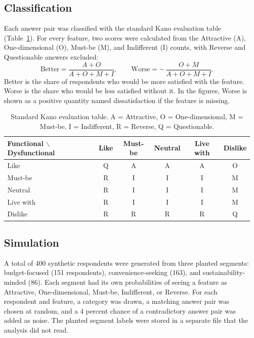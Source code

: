 \documentclass[11pt]{article}
\begin{document}
\subsection{Classification}
Each answer pair was classified with the standard Kano evaluation table (Table~\ref{tab:eval}). For every feature, two scores were calculated from the Attractive (A), One-dimensional (O), Must-be (M), and Indifferent (I) counts, with Reverse and Questionable answers excluded:
\[
\text{Better} = \frac{A + O}{A + O + M + I}, \qquad
\text{Worse} = -\,\frac{O + M}{A + O + M + I}.
\]
Better is the share of respondents who would be more satisfied with the feature. Worse is the share who would be less satisfied without it. In the figures, Worse is shown as a positive quantity named dissatisfaction if the feature is missing.

\begin{table}[H]
\centering
\caption{Standard Kano evaluation table. A = Attractive, O = One-dimensional, M = Must-be, I = Indifferent, R = Reverse, Q = Questionable.}
\label{tab:eval}
\begin{tabular}{lccccc}
\toprule
Functional $\backslash$ Dysfunctional & Like & Must-be & Neutral & Live with & Dislike \\
\midrule
Like      & Q & A & A & A & O \\
Must-be   & R & I & I & I & M \\
Neutral   & R & I & I & I & M \\
Live with & R & I & I & I & M \\
Dislike   & R & R & R & R & Q \\
\bottomrule
\end{tabular}
\end{table}

\subsection{Simulation}
A total of 400 synthetic respondents were generated from three planted segments: budget-focused (151 respondents), convenience-seeking (163), and sustainability-minded (86). Each segment had its own probabilities of seeing a feature as Attractive, One-dimensional, Must-be, Indifferent, or Reverse. For each respondent and feature, a category was drawn, a matching answer pair was chosen at random, and a 4 percent chance of a contradictory answer pair was added as noise. The planted segment labels were stored in a separate file that the analysis did not read.
\end{document}

